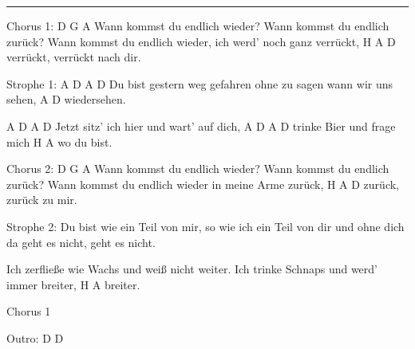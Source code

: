 \noindent\rule{\columnwidth}{1pt}

\begin{lstsong}
Chorus 1:
D                      G    A
Wann kommst du endlich wieder?
Wann kommst du endlich zurück?
Wann kommst du endlich wieder,
ich werd' noch ganz verrückt,
H             A             D
verrückt, verrückt nach dir.

Strophe 1:
A          D         A      D
Du bist gestern weg gefahren
ohne zu sagen wann wir uns sehen,
A     D
wiedersehen.

A               D         A        D
Jetzt sitz' ich hier und wart' auf dich,
A       D       A      D
trinke Bier und frage mich
H        A
wo du bist.

Chorus 2:
D                      G    A
Wann kommst du endlich wieder?
Wann kommst du endlich zurück?
Wann kommst du endlich wieder
in meine Arme zurück,
H          A          D
zurück, zurück zu mir.

Strophe 2:
Du bist wie ein Teil von mir,
so wie ich ein Teil von dir
und ohne dich da geht es nicht,
geht es nicht.

Ich zerfließe wie Wachs 
und weiß nicht weiter.
Ich trinke Schnaps
und werd' immer breiter,
H   A
breiter.

Chorus 1

Outro: D D
\end{lstsong}
\newpage


